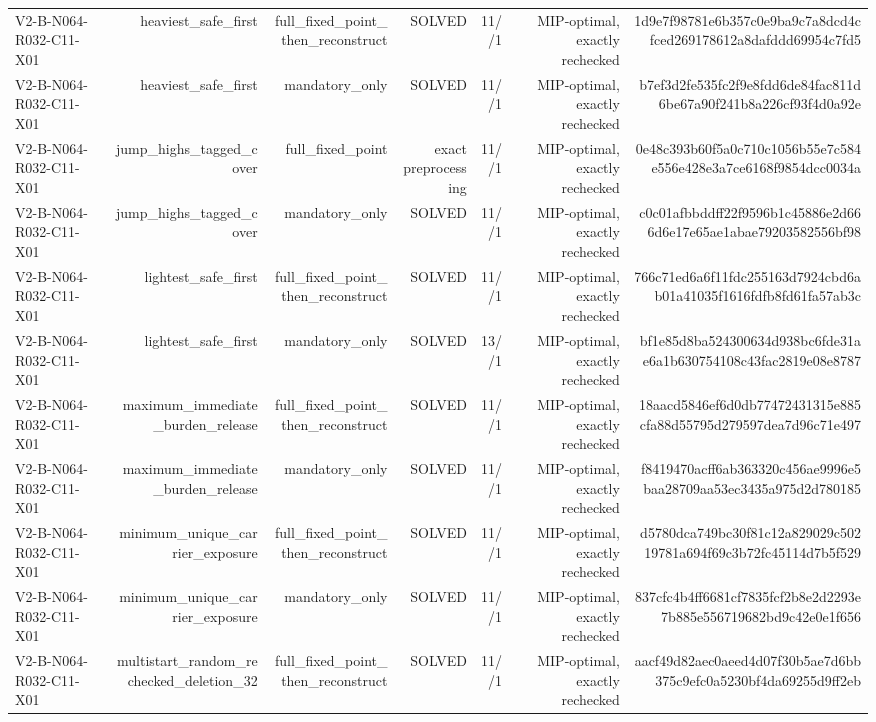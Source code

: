 {\begin{longtable}{lrrrrrr}
V2-B-N064-R032-C11-X01 & heaviest\_safe\_first & full\_fixed\_point\_then\_reconstruct & SOLVED & 11//1 & MIP-optimal, exactly rechecked & 1d9e7f98781e6b357c0e9ba9c7a8dcd4cfced269178612a8dafddd69954c7fd5 \\
V2-B-N064-R032-C11-X01 & heaviest\_safe\_first & mandatory\_only & SOLVED & 11//1 & MIP-optimal, exactly rechecked & b7ef3d2fe535fc2f9e8fdd6de84fac811d6be67a90f241b8a226cf93f4d0a92e \\
V2-B-N064-R032-C11-X01 & jump\_highs\_tagged\_cover & full\_fixed\_point & exact preprocessing & 11//1 & MIP-optimal, exactly rechecked & 0e48c393b60f5a0c710c1056b55e7c584e556e428e3a7ce6168f9854dcc0034a \\
V2-B-N064-R032-C11-X01 & jump\_highs\_tagged\_cover & mandatory\_only & SOLVED & 11//1 & MIP-optimal, exactly rechecked & c0c01afbbddff22f9596b1c45886e2d666d6e17e65ae1abae79203582556bf98 \\
V2-B-N064-R032-C11-X01 & lightest\_safe\_first & full\_fixed\_point\_then\_reconstruct & SOLVED & 11//1 & MIP-optimal, exactly rechecked & 766c71ed6a6f11fdc255163d7924cbd6ab01a41035f1616fdfb8fd61fa57ab3c \\
V2-B-N064-R032-C11-X01 & lightest\_safe\_first & mandatory\_only & SOLVED & 13//1 & MIP-optimal, exactly rechecked & bf1e85d8ba524300634d938bc6fde31ae6a1b630754108c43fac2819e08e8787 \\
V2-B-N064-R032-C11-X01 & maximum\_immediate\_burden\_release & full\_fixed\_point\_then\_reconstruct & SOLVED & 11//1 & MIP-optimal, exactly rechecked & 18aacd5846ef6d0db77472431315e885cfa88d55795d279597dea7d96c71e497 \\
V2-B-N064-R032-C11-X01 & maximum\_immediate\_burden\_release & mandatory\_only & SOLVED & 11//1 & MIP-optimal, exactly rechecked & f8419470acff6ab363320c456ae9996e5baa28709aa53ec3435a975d2d780185 \\
V2-B-N064-R032-C11-X01 & minimum\_unique\_carrier\_exposure & full\_fixed\_point\_then\_reconstruct & SOLVED & 11//1 & MIP-optimal, exactly rechecked & d5780dca749bc30f81c12a829029c50219781a694f69c3b72fc45114d7b5f529 \\
V2-B-N064-R032-C11-X01 & minimum\_unique\_carrier\_exposure & mandatory\_only & SOLVED & 11//1 & MIP-optimal, exactly rechecked & 837cfc4b4ff6681cf7835fcf2b8e2d2293e7b885e556719682bd9c42e0e1f656 \\
V2-B-N064-R032-C11-X01 & multistart\_random\_rechecked\_deletion\_32 & full\_fixed\_point\_then\_reconstruct & SOLVED & 11//1 & MIP-optimal, exactly rechecked & aacf49d82aec0aeed4d07f30b5ae7d6bb375c9efc0a5230bf4da69255d9ff2eb \\

\end{longtable}}
